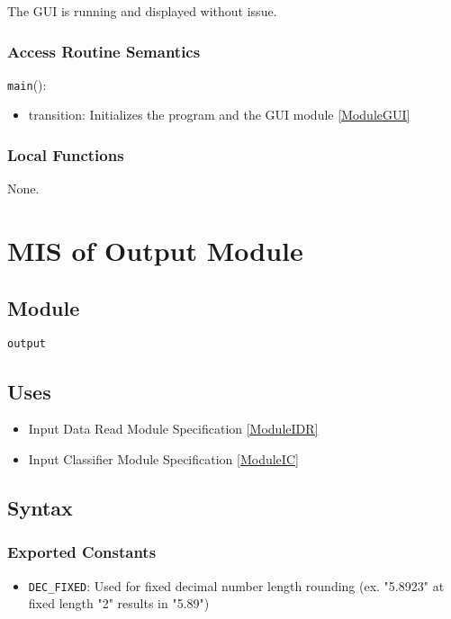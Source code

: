 \documentclass[12pt, titlepage]{article}
\def\code#1{\texttt{#1}}
\begin{document}
The GUI is running and displayed without issue.

\subsubsection{Access Routine Semantics}

\noindent \code{main}():
\begin{itemize}
  \item transition: Initializes the program and the GUI module \ref{ModuleGUI}
\end{itemize}

\subsubsection{Local Functions}

None.

\section{MIS of Output Module} \label{ModuleO} 


\subsection{Module}

\code{output}

\subsection{Uses}

\begin{itemize}
  \item Input Data Read Module Specification \ref{ModuleIDR}
  \item Input Classifier Module Specification \ref{ModuleIC}
\end{itemize}

\subsection{Syntax}

\subsubsection{Exported Constants}

\begin{itemize}
  \item \code{DEC\_FIXED}: Used for fixed decimal number length rounding (ex. "5.8923" at fixed length "2" results in "5.89")
\end{itemize}
\end{document}
